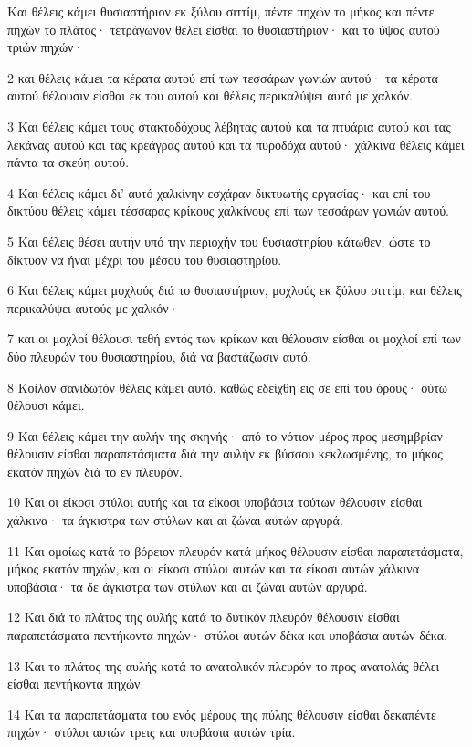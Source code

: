 \par Και θέλεις κάμει θυσιαστήριον εκ ξύλου σιττίμ, πέντε πηχών το μήκος και πέντε πηχών το πλάτος· τετράγωνον θέλει είσθαι το θυσιαστήριον· και το ύψος αυτού τριών πηχών·
\par 2 και θέλεις κάμει τα κέρατα αυτού επί των τεσσάρων γωνιών αυτού· τα κέρατα αυτού θέλουσιν είσθαι εκ του αυτού και θέλεις περικαλύψει αυτό με χαλκόν.
\par 3 Και θέλεις κάμει τους στακτοδόχους λέβητας αυτού και τα πτυάρια αυτού και τας λεκάνας αυτού και τας κρεάγρας αυτού και τα πυροδόχα αυτού· χάλκινα θέλεις κάμει πάντα τα σκεύη αυτού.
\par 4 Και θέλεις κάμει δι' αυτό χαλκίνην εσχάραν δικτυωτής εργασίας· και επί του δικτύου θέλεις κάμει τέσσαρας κρίκους χαλκίνους επί των τεσσάρων γωνιών αυτού.
\par 5 Και θέλεις θέσει αυτήν υπό την περιοχήν του θυσιαστηρίου κάτωθεν, ώστε το δίκτυον να ήναι μέχρι του μέσου του θυσιαστηρίου.
\par 6 Και θέλεις κάμει μοχλούς διά το θυσιαστήριον, μοχλούς εκ ξύλου σιττίμ, και θέλεις περικαλύψει αυτούς με χαλκόν·
\par 7 και οι μοχλοί θέλουσι τεθή εντός των κρίκων και θέλουσιν είσθαι οι μοχλοί επί των δύο πλευρών του θυσιαστηρίου, διά να βαστάζωσιν αυτό.
\par 8 Κοίλον σανιδωτόν θέλεις κάμει αυτό, καθώς εδείχθη εις σε επί του όρους· ούτω θέλουσι κάμει.
\par 9 Και θέλεις κάμει την αυλήν της σκηνής· από το νότιον μέρος προς μεσημβρίαν θέλουσιν είσθαι παραπετάσματα διά την αυλήν εκ βύσσου κεκλωσμένης, το μήκος εκατόν πηχών διά το εν πλευρόν.
\par 10 Και οι είκοσι στύλοι αυτής και τα είκοσι υποβάσια τούτων θέλουσιν είσθαι χάλκινα· τα άγκιστρα των στύλων και αι ζώναι αυτών αργυρά.
\par 11 Και ομοίως κατά το βόρειον πλευρόν κατά μήκος θέλουσιν είσθαι παραπετάσματα, μήκος εκατόν πηχών, και οι είκοσι στύλοι αυτών και τα είκοσι αυτών χάλκινα υποβάσια· τα δε άγκιστρα των στύλων και αι ζώναι αυτών αργυρά.
\par 12 Και διά το πλάτος της αυλής κατά το δυτικόν πλευρόν θέλουσιν είσθαι παραπετάσματα πεντήκοντα πηχών· στύλοι αυτών δέκα και υποβάσια αυτών δέκα.
\par 13 Και το πλάτος της αυλής κατά το ανατολικόν πλευρόν το προς ανατολάς θέλει είσθαι πεντήκοντα πηχών.
\par 14 Και τα παραπετάσματα του ενός μέρους της πύλης θέλουσιν είσθαι δεκαπέντε πηχών· στύλοι αυτών τρεις και υποβάσια αυτών τρία.
